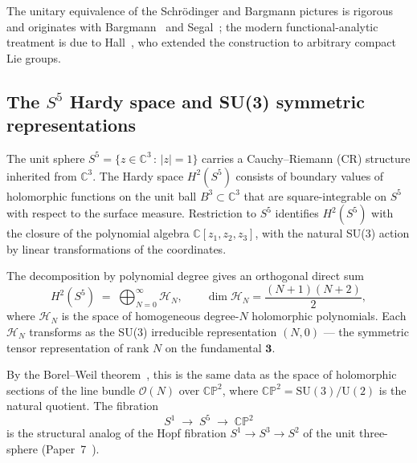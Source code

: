 \documentclass[twocolumn,pra,amsmath,amssymb,superscriptaddress]{revtex4-2}
\begin{document}
The unitary equivalence of the Schr\"odinger and Bargmann pictures
is rigorous and originates with Bargmann~\cite{bargmann1961} and
Segal~\cite{segal1963}; the modern functional-analytic treatment is
due to Hall~\cite{hall1994}, who extended the construction to
arbitrary compact Lie groups.

\subsection{The $S^5$ Hardy space and SU(3) symmetric representations}

The unit sphere
$S^5 = \{ z \in \mathbb{C}^3 \,:\, |z| = 1 \}$
carries a Cauchy--Riemann (CR) structure inherited from
$\mathbb{C}^3$.  The Hardy space $H^2(S^5)$ consists of boundary
values of holomorphic functions on the unit ball $B^3 \subset
\mathbb{C}^3$ that are square-integrable on $S^5$ with respect to
the surface measure.  Restriction to $S^5$ identifies $H^2(S^5)$
with the closure of the polynomial algebra $\mathbb{C}[z_1, z_2,
z_3]$, with the natural SU(3) action by linear transformations of
the coordinates.

The decomposition by polynomial degree gives an orthogonal direct
sum
\begin{equation}
  H^2(S^5)
  \;=\;
  \bigoplus_{N = 0}^{\infty}
  \mathcal{H}_N,
  \qquad
  \dim \mathcal{H}_N = \frac{(N+1)(N+2)}{2},
  \label{eq:hardy-decomp}
\end{equation}
where $\mathcal{H}_N$ is the space of homogeneous degree-$N$
holomorphic polynomials.  Each $\mathcal{H}_N$ transforms as the
SU(3) irreducible representation $(N, 0)$ — the symmetric tensor
representation of rank $N$ on the fundamental $\mathbf{3}$.

By the Borel--Weil theorem~\cite{borelweil}, this is the same data
as the space of holomorphic sections of the line bundle
$\mathcal{O}(N)$ over $\mathbb{CP}^2$, where $\mathbb{CP}^2 =
\mathrm{SU}(3) / \mathrm{U}(2)$ is the natural quotient.  The
fibration
\begin{equation}
  S^1 \;\longrightarrow\; S^5 \;\longrightarrow\; \mathbb{CP}^2
  \label{eq:s5-fibration}
\end{equation}
is the structural analog of the Hopf fibration $S^1 \to S^3 \to
S^2$ of the unit three-sphere (Paper~7~\cite{paper7}).
\end{document}
